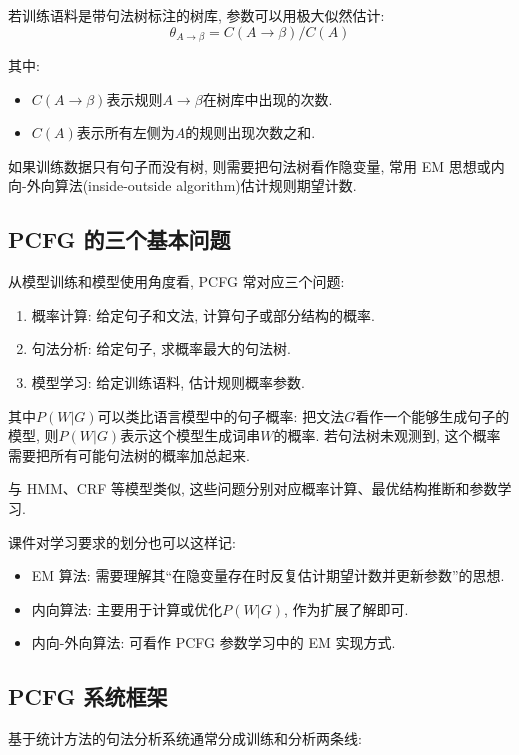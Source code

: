 若训练语料是带句法树标注的树库, 参数可以用极大似然估计:
\[
\theta_{A \to \beta}
    = C(A \to \beta) / C(A)
\]

其中:

\begin{itemize}
\item $C(A \to \beta)$表示规则$A \to \beta$在树库中出现的次数.
\item $C(A)$表示所有左侧为$A$的规则出现次数之和.
\end{itemize}

如果训练数据只有句子而没有树, 则需要把句法树看作隐变量,
常用 EM 思想或内向-外向算法(inside-outside algorithm)估计规则期望计数.

\subsection{PCFG 的三个基本问题}


从模型训练和模型使用角度看, PCFG 常对应三个问题:

\begin{enumerate}
\item[1.] 概率计算: 给定句子和文法, 计算句子或部分结构的概率.
\item[2.] 句法分析: 给定句子, 求概率最大的句法树.
\item[3.] 模型学习: 给定训练语料, 估计规则概率参数.
\end{enumerate}

其中$P(W | G)$可以类比语言模型中的句子概率:
把文法$G$看作一个能够生成句子的模型,
则$P(W | G)$表示这个模型生成词串$W$的概率.
若句法树未观测到, 这个概率需要把所有可能句法树的概率加总起来.

与 HMM、CRF 等模型类似, 这些问题分别对应概率计算、最优结构推断和参数学习.

课件对学习要求的划分也可以这样记:

\begin{itemize}
\item EM 算法: 需要理解其“在隐变量存在时反复估计期望计数并更新参数”的思想.
\item 内向算法: 主要用于计算或优化$P(W | G)$, 作为扩展了解即可.
\item 内向-外向算法: 可看作 PCFG 参数学习中的 EM 实现方式.
\end{itemize}

\subsection{PCFG 系统框架}


基于统计方法的句法分析系统通常分成训练和分析两条线:

